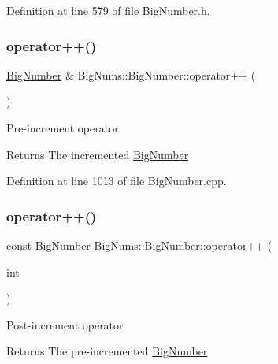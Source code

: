 Definition at line 579 of file Big\+Number.\+h.

\mbox{\label{class_big_nums_1_1_big_number_aac54f4e6e678b26552cef3dbcd18d41f}} 
\subsubsection{\texorpdfstring{operator++()}{operator++()}\hspace{0.1cm}{\footnotesize\ttfamily [1/2]}}
{\footnotesize\ttfamily \mbox{\hyperlink{class_big_nums_1_1_big_number}{Big\+Number}} \& Big\+Nums\+::\+Big\+Number\+::operator++ (\begin{DoxyParamCaption}{ }\end{DoxyParamCaption})}

Pre-\/increment operator \begin{DoxyReturn}{Returns}
The incremented \mbox{\hyperlink{class_big_nums_1_1_big_number}{Big\+Number}} 
\end{DoxyReturn}


Definition at line 1013 of file Big\+Number.\+cpp.

\mbox{\label{class_big_nums_1_1_big_number_a62c972147e0c20614fa6f2b3831b15b8}} 
\subsubsection{\texorpdfstring{operator++()}{operator++()}\hspace{0.1cm}{\footnotesize\ttfamily [2/2]}}
{\footnotesize\ttfamily const \mbox{\hyperlink{class_big_nums_1_1_big_number}{Big\+Number}} Big\+Nums\+::\+Big\+Number\+::operator++ (\begin{DoxyParamCaption}\item[{int}]{ }\end{DoxyParamCaption})}

Post-\/increment operator \begin{DoxyReturn}{Returns}
The pre-\/incremented \mbox{\hyperlink{class_big_nums_1_1_big_number}{Big\+Number}} 
\end{DoxyReturn}


